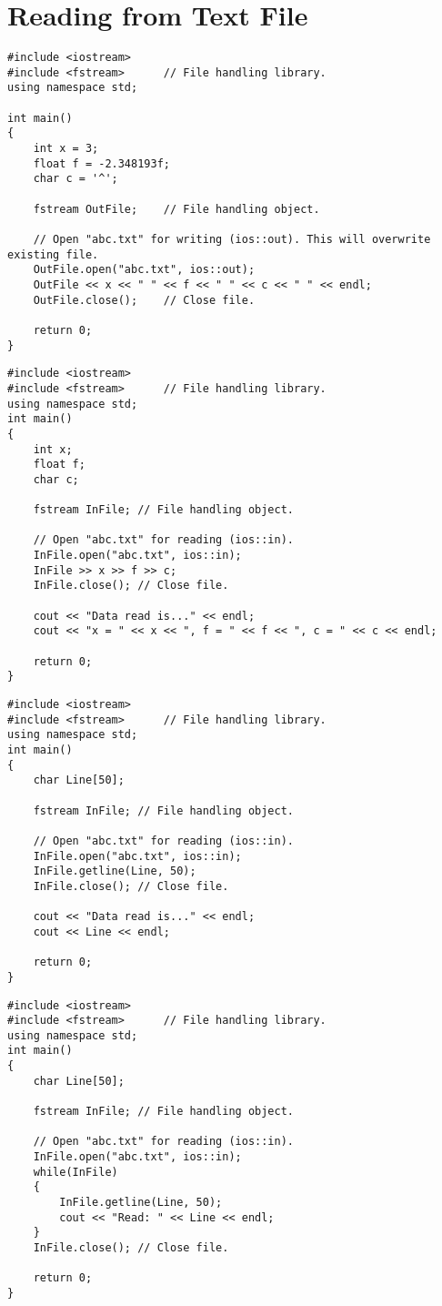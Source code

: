 \documentclass[12pt,a4paper]{article}
\begin{document}
\section{Reading from Text File}
\begin{lstlisting}[caption={Reading from text file (Creating file)}]
#include <iostream>
#include <fstream>		// File handling library.
using namespace std;

int main()
{
	int x = 3;
	float f = -2.348193f;
	char c = '^';

	fstream OutFile;	// File handling object.

	// Open "abc.txt" for writing (ios::out). This will overwrite existing file.
	OutFile.open("abc.txt", ios::out);
	OutFile << x << " " << f << " " << c << " " << endl;
	OutFile.close();	// Close file.
	
	return 0;
}
\end{lstlisting}
\begin{lstlisting}[caption={Reading from text file}]
#include <iostream>
#include <fstream>		// File handling library.
using namespace std;
int main()
{
	int x;
	float f;
	char c;

	fstream InFile;	// File handling object.

	// Open "abc.txt" for reading (ios::in).
	InFile.open("abc.txt", ios::in);
	InFile >> x >> f >> c;
	InFile.close();	// Close file.
	
	cout << "Data read is..." << endl;
	cout << "x = " << x << ", f = " << f << ", c = " << c << endl;

	return 0;
}
\end{lstlisting}
\begin{lstlisting}[caption={Reading a line from text file}]
#include <iostream>
#include <fstream>		// File handling library.
using namespace std;
int main()
{
	char Line[50];

	fstream InFile;	// File handling object.

	// Open "abc.txt" for reading (ios::in).
	InFile.open("abc.txt", ios::in);
	InFile.getline(Line, 50);
	InFile.close();	// Close file.
	
	cout << "Data read is..." << endl;
	cout << Line << endl;

	return 0;
}
\end{lstlisting}
\begin{lstlisting}[caption={Reading a whole text file line--by--line}]
#include <iostream>
#include <fstream>		// File handling library.
using namespace std;
int main()
{
	char Line[50];

	fstream InFile;	// File handling object.

	// Open "abc.txt" for reading (ios::in).
	InFile.open("abc.txt", ios::in);
	while(InFile)
	{
		InFile.getline(Line, 50);
		cout << "Read: " << Line << endl;
	}
	InFile.close();	// Close file.

	return 0;
}
\end{lstlisting}
\end{document}
